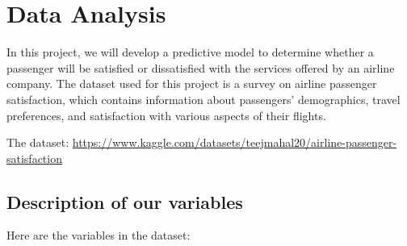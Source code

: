 \documentclass[
]{article}
\begin{document}
\hypertarget{data-analysis}{%
\section{Data Analysis}\label{data-analysis}}

In this project, we will develop a predictive model to determine whether
a passenger will be satisfied or dissatisfied with the services offered
by an airline company. The dataset used for this project is a survey on
airline passenger satisfaction, which contains information about
passengers' demographics, travel preferences, and satisfaction with
various aspects of their flights.

The dataset:
\url{https://www.kaggle.com/datasets/teejmahal20/airline-passenger-satisfaction}

\hypertarget{description-of-our-variables}{%
\subsection{Description of our
variables}\label{description-of-our-variables}}

Here are the variables in the dataset:
\end{document}
